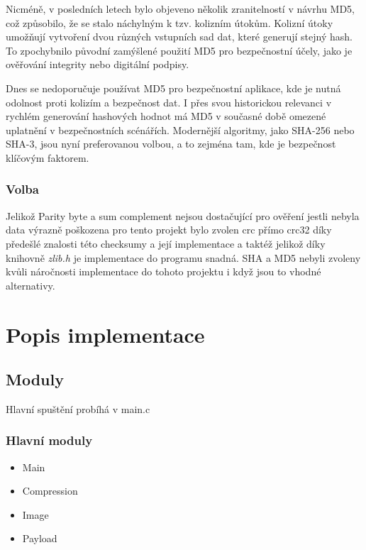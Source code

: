 \documentclass[12pt]{report}
\begin{document}
    Nicméně, v posledních letech bylo objeveno několik zranitelností v návrhu MD5, což způsobilo, že se stalo náchylným k tzv. kolizním útokům. Kolizní útoky umožňují vytvoření dvou různých vstupních sad dat, které generují stejný hash. To zpochybnilo původní zamýšlené použití MD5 pro bezpečnostní účely, jako je ověřování integrity nebo digitální podpisy.

    Dnes se nedoporučuje používat MD5 pro bezpečnostní aplikace, kde je nutná odolnost proti kolizím a bezpečnost dat. I přes svou historickou relevanci v rychlém generování hashových hodnot má MD5 v současné době omezené uplatnění v bezpečnostních scénářích. Modernější algoritmy, jako SHA-256 nebo SHA-3, jsou nyní preferovanou volbou, a to zejména tam, kde je bezpečnost klíčovým faktorem.
    \cite{MD5Wikip50:online}

\subsection{Volba}
    Jelikož Parity byte a sum complement nejsou dostačující pro ověření jestli nebyla data výrazně poškozena pro tento projekt bylo zvolen crc přímo crc32 díky předešlé znalosti této checksumy a její implementace a taktéž jelikož díky knihovně \textit{zlib.h} je implementace do programu snadná. SHA a MD5 nebyli zvoleny kvůli náročnosti implementace do tohoto projektu i když jsou to vhodné alternativy.




    \chapter{Popis implementace}
 
\section{   Moduly}
    Hlavní spuštění probíhá v main.c
    
   
\subsection{Hlavní moduly}
    \begin{itemize}
        \item Main
        \item Compression
        \item Image
        \item Payload
    \end{itemize}
\end{document}
